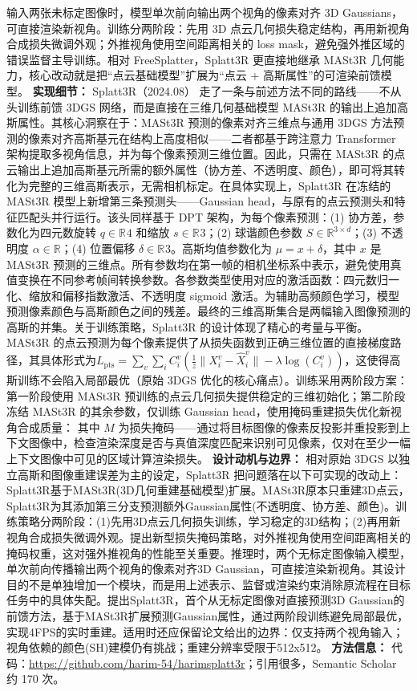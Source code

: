 输入两张未标定图像时，模型单次前向输出两个视角的像素对齐 3D Gaussians，可直接渲染新视角。训练分两阶段：先用 3D 点云几何损失稳定结构，再用新视角合成损失微调外观；外推视角使用空间距离相关的 loss mask，避免强外推区域的错误监督主导训练。相对 FreeSplatter，Splatt3R 更直接地继承 MASt3R 几何能力，核心改动就是把“点云基础模型”扩展为“点云 + 高斯属性”的可渲染前馈模型。
\textbf{实现细节：} Splatt3R（2024.08） 走了一条与前述方法不同的路线——不从头训练前馈 3DGS 网络，而是直接在三维几何基础模型 MASt3R 的输出上追加高斯属性。其核心洞察在于：MASt3R 预测的像素对齐三维点与通用 3DGS 方法预测的像素对齐高斯基元在结构上高度相似——二者都基于跨注意力 Transformer 架构提取多视角信息，并为每个像素预测三维位置。因此，只需在 MASt3R 的点云输出上追加高斯基元所需的额外属性（协方差、不透明度、颜色），即可将其转化为完整的三维高斯表示，无需相机标定。在具体实现上，Splatt3R 在冻结的 MASt3R 模型上新增第三条预测头——Gaussian head，与原有的点云预测头和特征匹配头并行运行。该头同样基于 DPT 架构，为每个像素预测：(1) 协方差，参数化为四元数旋转 $q \in \mathbb{R}^{}4$ 和缩放 $s \in \mathbb{R}^{}3$；(2) 球谐颜色参数 $S \in \mathbb{R}^{3 \times d}$；(3) 不透明度 $\alpha \in \mathbb{R}$；(4) 位置偏移 $\delta \in \mathbb{R}^{}3$。高斯均值参数化为 $\mu = x + \delta$，其中 $x$ 是 MASt3R 预测的三维点。所有参数均在第一帧的相机坐标系中表示，避免使用真值变换在不同参考帧间转换参数。各参数类型使用对应的激活函数：四元数归一化、缩放和偏移指数激活、不透明度 sigmoid 激活。为辅助高频颜色学习，模型预测像素颜色与高斯颜色之间的残差。最终的三维高斯集合是两幅输入图像预测的高斯的并集。关于训练策略，Splatt3R 的设计体现了精心的考量与平衡。MASt3R 的点云预测为每个像素提供了从损失函数到正确三维位置的直接梯度路径，其具体形式为$L_\mathrm{pts} = \sum_{v} \sum_i C_i^v \left(\frac{1}{z}\|X_i^v - \hat{X}_i^v\| - \lambda \log(C_i^v)\right)$，这使得高斯训练不会陷入局部最优（原始 3DGS 优化的核心痛点）。训练采用两阶段方案：第一阶段使用 MASt3R 预训练的点云几何损失提供稳定的三维初始化；第二阶段冻结 MASt3R 的其余参数，仅训练 Gaussian head，使用掩码重建损失优化新视角合成质量： 其中 $M$ 为损失掩码——通过将目标图像的像素反投影并重投影到上下文图像中，检查渲染深度是否与真值深度匹配来识别可见像素，仅对在至少一幅上下文图像中可见的区域计算渲染损失。
\textbf{设计动机与边界：} 相对原始 3DGS 以独立高斯和图像重建误差为主的设定，Splatt3R 把问题落在以下可实现的改动上：Splatt3R基于MASt3R(3D几何重建基础模型)扩展。MASt3R原本只重建3D点云，Splatt3R为其添加第三分支预测额外Gaussian属性(不透明度、协方差、颜色)。训练策略分两阶段：(1)先用3D点云几何损失训练，学习稳定的3D结构；(2)再用新视角合成损失微调外观。提出新型损失掩码策略，对外推视角使用空间距离相关的掩码权重，这对强外推视角的性能至关重要。推理时，两个无标定图像输入模型，单次前向传播输出两个视角的像素对齐3D Gaussian，可直接渲染新视角。其设计目的不是单独增加一个模块，而是用上述表示、监督或渲染约束消除原流程在目标任务中的具体失配。提出Splatt3R，首个从无标定图像对直接预测3D Gaussian的前馈方法，基于MASt3R扩展预测Gaussian属性，通过两阶段训练避免局部最优，实现4FPS的实时重建。适用时还应保留论文给出的边界：仅支持两个视角输入；视角依赖的颜色(SH)建模仍有挑战；重建分辨率受限于512x512。
\textbf{方法信息：} 代码：\url{https://github.com/harim-54/harimsplatt3r}；引用很多，Semantic Scholar 约 170 次。



